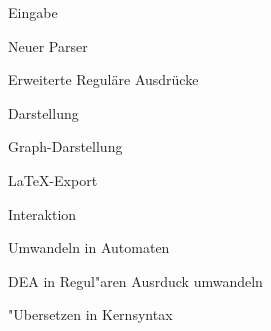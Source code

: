 {
   \begin{itemgroup}{}
      \item Eingabe
      \begin{itemgroup}{}
         \item Neuer Parser
         \item Erweiterte Reguläre Ausdrücke
      \end{itemgroup}
      \item Darstellung
      \begin{itemgroup}{}
         \item Graph-Darstellung
         \item \LaTeX-Export
      \end{itemgroup}
      \item Interaktion
      \begin{itemgroup}{}
         \item Umwandeln in Automaten
         \item DEA in Regul"aren Ausrduck umwandeln
         \item "Ubersetzen in Kernsyntax
      \end{itemgroup}
   \end{itemgroup}
   \vfill{}
}
